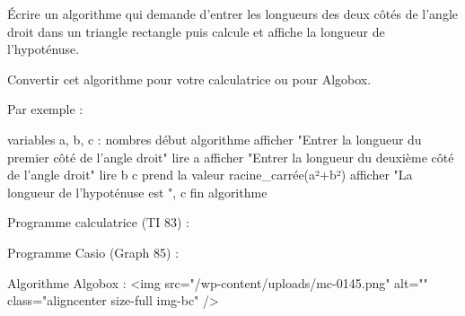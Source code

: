 
%
Écrire un algorithme qui demande d'entrer les longueurs des deux côtés de l'angle droit dans un triangle rectangle puis calcule et affiche la longueur de l'hypoténuse.
\par
Convertir cet algorithme pour votre calculatrice ou pour Algobox.
\begin{corrige}
     Par exemple :
\begin{code}
variables
   a, b, c : nombres
début algorithme
   afficher "Entrer la longueur du premier côté de l'angle droit"
   lire a
   afficher "Entrer la longueur du deuxième côté de l'angle droit"
   lire b
   c prend la valeur racine_carrée(a²+b²)
   afficher "La longueur de l'hypoténuse est ", c
fin algorithme
\end{code}
     Programme calculatrice (TI 83) :
\begin{center}
\end{center}

     Programme Casio (Graph 85) :
\begin{center}
\end{center}
     Algorithme Algobox :
     <img src="/wp-content/uploads/mc-0145.png" alt="" class="aligncenter size-full  img-bc" />
\end{corrige}
